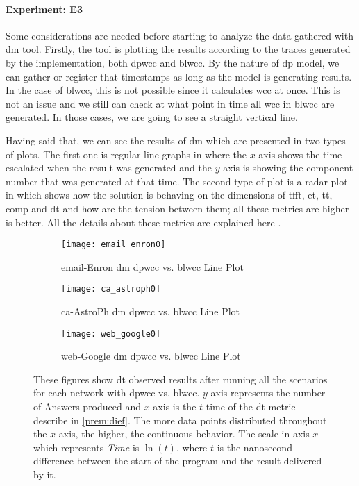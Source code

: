 \paragraph{Experiment: E3}\label{sub:new:sec:e2}
Some considerations are needed before starting to analyze the data gathered with \acrshort{dm} tool. 
Firstly, the tool is plotting the results according to the traces generated by the implementation, both \acrshort{dpwcc} and \acrshort{blwcc}. 
By the nature of \acrshort{dp} model, we can gather or register that timestamps as long as the model is generating results. 
In the case of \acrshort{blwcc}, this is not possible since it calculates \acrshort{wcc} at once. 
This is not an issue and we still can check at what point in time all \acrshort{wcc} in \acrshort{blwcc} are generated. 
In those cases, we are going to see a straight vertical line. 

Having said that, we can see the results of \acrshort{dm} which are presented in two types of plots. 
The first one is regular line graphs in where the $x$ axis shows the time escalated when the result was generated and the $y$ axis is showing the component number that was generated at that time. The second type of plot is a radar plot in which shows how the solution is behaving on the dimensions of  \acrfull{tfft}, \acrfull{et}, \acrfull{tt}, \acrfull{comp} and \acrfull{dt} and how are the tension between them; all these metrics are higher is better. All the details about these metrics are explained here \cite{diefpaper}.

\begin{figure}[!htp]
  \centering
  \begin{subfigure}[t]{0.3\textwidth}
   \texttt{[image: email\_enron0]}
   \caption{email-Enron \acrlong{dm} \acrshort{dpwcc} vs. \acrshort{blwcc} Line Plot}
    \label{fig:dief:1}
  \end{subfigure}\hfill
  \begin{subfigure}[t]{0.3\textwidth}
   \texttt{[image: ca\_astroph0]}
   \caption{ca-AstroPh \acrlong{dm} \acrshort{dpwcc} vs. \acrshort{blwcc} Line Plot}
    \label{fig:dief:2}
  \end{subfigure}\hfill
  \begin{subfigure}[t]{0.3\textwidth}
   \texttt{[image: web\_google0]}
   \caption{web-Google \acrlong{dm} \acrshort{dpwcc} vs. \acrshort{blwcc} Line Plot}
    \label{fig:dief:3}
  \end{subfigure}\hfill
   \caption{These figures show \acrshort{dt} observed results after running all the scenarios for each network with \acrshort{dpwcc} vs. \acrshort{blwcc}. $y$ axis represents the number of Answers produced and $x$ axis is the $t$ time of the \acrshort{dt} metric describe in \autoref{prem:dief}. The more data points distributed throughout the $x$ axis, the higher, the continuous behavior. The scale in axis $x$ which represents \textit{Time} is $\ln(t)$, where $t$ is the nanosecond difference between the start of the program and the result delivered by it.}
   \label{fig:dief:old:all}
 \end{figure}


